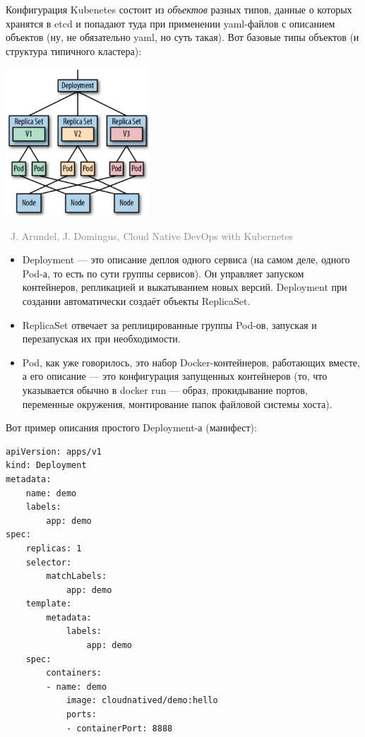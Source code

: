 \documentclass[a5paper]{article}
\newcommand{\attribution}[1] {
    \vspace{-5mm}\begin{flushright}\begin{scriptsize}\textcolor{gray}{\textcopyright\, #1}\end{scriptsize}\end{flushright}
}
\begin{document}
Конфигурация Kubenetes состоит из \emph{объектов} разных типов, данные о которых хранятся в etcd и попадают туда при применении yaml-файлов с описанием объектов (ну, не обязательно yaml, но суть такая). Вот базовые типы объектов (и структура типичного кластера):

\begin{center}
    \includegraphics[width=0.4\textwidth]{kubernetesObjects.png}
    \attribution{J. Arundel, J. Domingus, Cloud Native DevOps with Kubernetes}
\end{center}

\begin{itemize}
    \item Deployment --- это описание деплоя одного сервиса (на самом деле, одного Pod-а, то есть по сути группы сервисов). Он управляет запуском контейнеров, репликацией и выкатыванием новых версий. Deployment при создании автоматически создаёт объекты ReplicaSet.
    \item ReplicaSet отвечает за реплицированные группы Pod-ов, запуская и перезапуская их при необходимости.
    \item Pod, как уже говорилось, это набор Docker-контейнеров, работающих вместе, а его описание --- это конфигурация запущенных контейнеров (то, что указывается обычно в docker run --- образ, прокидывание портов, переменные окружения, монтирование папок файловой системы хоста).
\end{itemize}

Вот пример описания простого Deployment-а (манифест):

\begin{verbatim}
apiVersion: apps/v1
kind: Deployment
metadata:
    name: demo
    labels:
        app: demo
spec:
    replicas: 1
    selector:
        matchLabels:
            app: demo
    template:
        metadata:
            labels:
                app: demo
    spec:
        containers:
        - name: demo
            image: cloudnatived/demo:hello
            ports:
            - containerPort: 8888
\end{verbatim}
\end{document}
